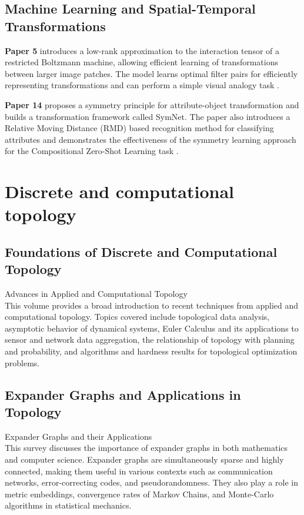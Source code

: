 \documentclass{article}
\begin{document}
\subsection{Machine Learning and Spatial-Temporal Transformations}

\textbf{Paper 5} introduces a low-rank approximation to the interaction tensor of a restricted Boltzmann machine, allowing efficient learning of transformations between larger image patches. The model learns optimal filter pairs for efficiently representing transformations and can perform a simple visual analogy task \cite{Memisevic2010LearningTR}.

\textbf{Paper 14} proposes a symmetry principle for attribute-object transformation and builds a transformation framework called SymNet. The paper also introduces a Relative Moving Distance (RMD) based recognition method for classifying attributes and demonstrates the effectiveness of the symmetry learning approach for the Compositional Zero-Shot Learning task \cite{Li2020SymmetryAG}.


\section{Discrete and computational topology}

\subsection{Foundations of Discrete and Computational Topology}

\cite{Zomorodian2012AdvancesIA} Advances in Applied and Computational Topology \\
This volume provides a broad introduction to recent techniques from applied and computational topology. Topics covered include topological data analysis, asymptotic behavior of dynamical systems, Euler Calculus and its applications to sensor and network data aggregation, the relationship of topology with planning and probability, and algorithms and hardness results for topological optimization problems.

\subsection{Expander Graphs and Applications in Topology}

\cite{Hoory2006ExpanderGA} Expander Graphs and their Applications \\
This survey discusses the importance of expander graphs in both mathematics and computer science. Expander graphs are simultaneously sparse and highly connected, making them useful in various contexts such as communication networks, error-correcting codes, and pseudorandomness. They also play a role in metric embeddings, convergence rates of Markov Chains, and Monte-Carlo algorithms in statistical mechanics.
\end{document}
